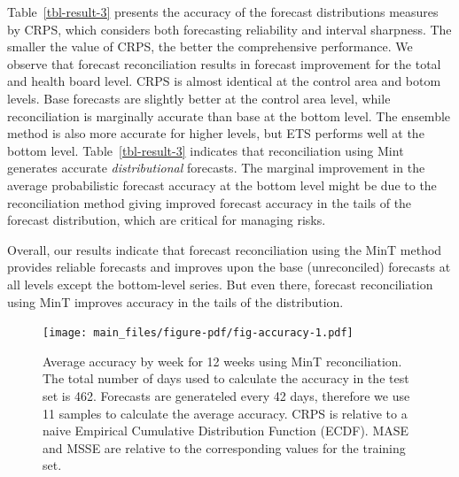 \documentclass[
  authoryear,
  preprint,
  3p]{elsarticle}
\begin{document}
\begin{table}
\begin{minipage}[t]{\linewidth}
{}

\end{minipage}%

\end{table}

Table~\ref{tbl-result-3} presents the accuracy of the forecast
distributions measures by CRPS, which considers both forecasting
reliability and interval sharpness. The smaller the value of CRPS, the
better the comprehensive performance. We observe that forecast
reconciliation results in forecast improvement for the total and health
board level. CRPS is almost identical at the control area and botom
levels. Base forecasts are slightly better at the control area level,
while reconciliation is marginally accurate than base at the bottom
level. The ensemble method is also more accurate for higher levels, but
ETS performs well at the bottom level. Table~\ref{tbl-result-3}
indicates that reconciliation using Mint generates accurate
\emph{distributional} forecasts. The marginal improvement in the average
probabilistic forecast accuracy at the bottom level might be due to the
reconciliation method giving improved forecast accuracy in the tails of
the forecast distribution, which are critical for managing risks.

Overall, our results indicate that forecast reconciliation using the
MinT method provides reliable forecasts and improves upon the base
(unreconciled) forecasts at all levels except the bottom-level series.
But even there, forecast reconciliation using MinT improves accuracy in
the tails of the distribution.

\begin{figure}[H]

{\centering \texttt{[image: main\_files/figure-pdf/fig-accuracy-1.pdf]}

}

\caption{\label{fig-accuracy}Average accuracy by week for 12 weeks using
MinT reconciliation. The total number of days used to calculate the
accuracy in the test set is 462. Forecasts are generateled every 42
days, therefore we use 11 samples to calculate the average accuracy.
CRPS is relative to a naive Empirical Cumulative Distribution Function
(ECDF). MASE and MSSE are relative to the corresponding values for the
training set.}

\end{figure}
\end{document}
